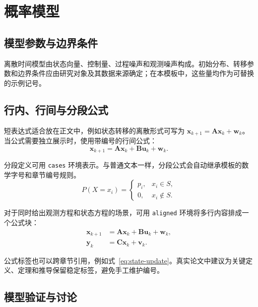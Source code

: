 \section{概率模型}

\subsection{模型参数与边界条件}

离散时间模型由状态向量、控制量、过程噪声和观测噪声构成。初始分布、转移参数和边界条件应由研究对象及其数据来源确定；在本模板中，这些量均作为可替换的示例记号。

\subsection{行内、行间与分段公式}

短表达式适合放在正文中，例如状态转移的离散形式可写为 $\bm{x}_{k+1}=\bm{A}\bm{x}_k+\bm{w}_k$。当公式需要独立展示时，使用带编号的行间公式：
\begin{equation}
  \bm{x}_{k+1}=\bm{A}\bm{x}_k+\bm{B}\bm{u}_k+\bm{w}_k.
  \label{eq:state-update}
\end{equation}

分段定义可用 \texttt{cases} 环境表示。与普通文本一样，分段公式会自动继承模板的数学字号和章节编号规则。
\begin{equation}
  P(X=x_i)=
  \begin{cases}
    p_i, & x_i\in S,\\
    0, & x_i\notin S.
  \end{cases}
  \label{eq:piecewise-probability}
\end{equation}

对于同时给出观测方程和状态方程的场景，可用 \texttt{aligned} 环境将多行内容排成一个公式块：
\begin{equation}
  \begin{aligned}
    \bm{x}_{k+1}&=\bm{A}\bm{x}_k+\bm{B}\bm{u}_k+\bm{w}_k,\\
    \bm{y}_k&=\bm{C}\bm{x}_k+\bm{v}_k.
  \end{aligned}
  \label{eq:state-observation}
\end{equation}

公式标签也可以跨章节引用，例如式~\eqref{eq:state-update}。真实论文中建议为关键定义、定理和推导保留稳定标签，避免手工维护编号。

\subsection{模型验证与讨论}

